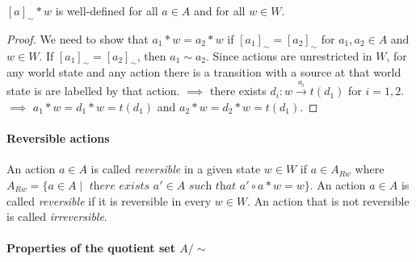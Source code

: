 \begin{proposition}
    $[a]_{\sim} * w$ is well-defined for all $a \in A$ and for all $w \in W$.
\end{proposition}
\begin{proof}
    We need to show that $a_{1} * w = a_{2} * w$ if $[a_{1}]_{\sim} = [a_{2}]_{\sim}$ for $a_{1},a_{2} \in A$ and $w \in W$.
    If $[a_{1}]_{\sim} = [a_{2}]_{\sim}$, then $a_{1} \sim a_{2}$.
    Since actions are unrestricted in $W$, for any world state and any action there is a transition with a source at that world state is are labelled by that action.
    $\implies$ there exists $d_{i}: w \xrightarrow{a_{i}} t(d_{1})$ for $i=1,2$.
    $\implies$ $a_{1} * w = d_{1} * w = t(d_{1})$ and $a_{2} * w = d_{2} * w = t(d_{1})$.
\end{proof}

\paragraph{Reversible actions}
An action $a \in A$ is called \textit{reversible} in a given state $w \in W$ if $a \in A_{R w}$ where $A_{Rw} = \{a \in A \mid\textit{ there exists }a' \in A\textit{ such that }a' \circ a * w = w \}$.
An action $a \in A$ is called \textit{reversible} if it is reversible in every $w \in W$.
An action that is not reversible is called \textit{irreversible}.

\paragraph{Properties of the quotient set $A/\sim$}

